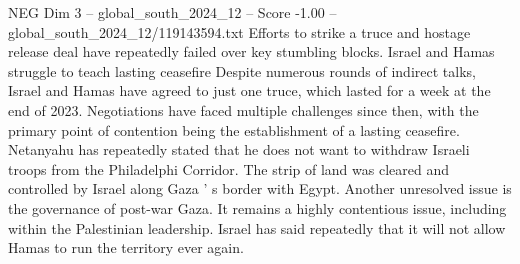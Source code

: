 \begin{textsample}{NEG Dim 3 – global\_south\_2024\_12 – Score -1.00 – global\_south\_2024\_12/119143594.txt}
Efforts to strike a truce and hostage release deal have repeatedly failed over key stumbling blocks.
Israel and Hamas struggle to teach lasting ceasefire Despite numerous rounds of indirect talks, Israel and Hamas have agreed to just one truce, which lasted for a week at the end of 2023.
Negotiations have faced multiple challenges since then, with the primary point of contention being the establishment of a lasting ceasefire.
Netanyahu has repeatedly stated that he does not want to withdraw Israeli troops from the Philadelphi Corridor.
The strip of land was cleared and controlled by Israel along Gaza ' s border with Egypt.
Another unresolved issue is the governance of post-war Gaza.
It remains a highly contentious issue, including within the Palestinian leadership.
Israel has said repeatedly that it will not allow Hamas to run the territory ever again.

\end{textsample}
